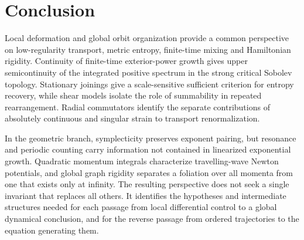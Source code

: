 \documentclass[review,12pt,times,a4paper,nopreprintline]{elsarticle}
\theoremstyle{plain}
\theoremstyle{definition}
\theoremstyle{remark}
\numberwithin{equation}{section}
\begin{document}
\section{Conclusion}
Local deformation and global orbit organization provide a common perspective on low-regularity transport, metric entropy, finite-time mixing and Hamiltonian rigidity. Continuity of finite-time exterior-power growth gives upper semicontinuity of the integrated positive spectrum in the strong critical Sobolev topology. Stationary joinings give a scale-sensitive sufficient criterion for entropy recovery, while shear models isolate the role of summability in repeated rearrangement. Radial commutators identify the separate contributions of absolutely continuous and singular strain to transport renormalization.

In the geometric branch, symplecticity preserves exponent pairing, but resonance and periodic counting carry information not contained in linearized exponential growth. Quadratic momentum integrals characterize travelling-wave Newton potentials, and global graph rigidity separates a foliation over all momenta from one that exists only at infinity. The resulting perspective does not seek a single invariant that replaces all others. It identifies the hypotheses and intermediate structures needed for each passage from local differential control to a global dynamical conclusion, and for the reverse passage from ordered trajectories to the equation generating them.
\end{document}
